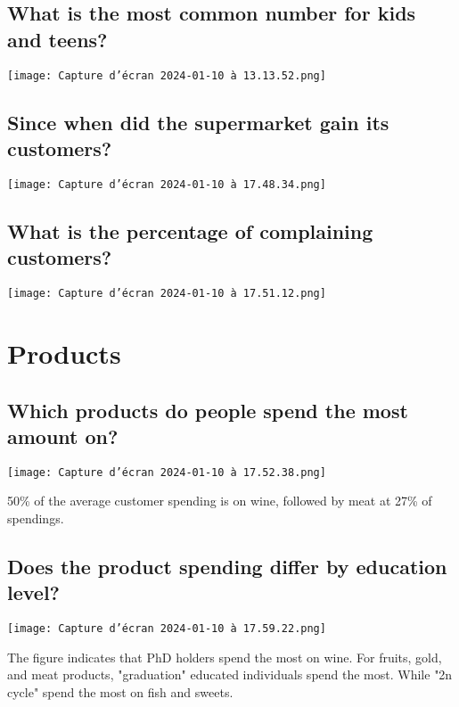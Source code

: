 \documentclass[12pt,a4paper]{report}
\begin{document}
\subsection{What is the most common number for kids and teens?}
\begin{center}
    \texttt{[image: Capture d’écran 2024-01-10 à 13.13.52.png]}            
    \label{fig1}
\end{center}
\subsection{Since when did the supermarket gain its customers?}

\begin{center}
    \texttt{[image: Capture d’écran 2024-01-10 à 17.48.34.png]}            
    \label{fig1}
\end{center}

\subsection{What is the percentage of complaining customers?}
\begin{center}
    \texttt{[image: Capture d’écran 2024-01-10 à 17.51.12.png]}            
    \label{fig1}
\end{center}
\newpage
\section{Products}
\subsection {Which products do people spend the most amount on?}
\begin{center}
    \texttt{[image: Capture d’écran 2024-01-10 à 17.52.38.png]}      
\end{center}     
50\% of the average customer spending is on wine, followed by meat at 27\% of spendings.


\subsection {Does the product spending differ by education level?}
\begin{center}
    \texttt{[image: Capture d’écran 2024-01-10 à 17.59.22.png]}      
\end{center}     
The figure indicates that PhD holders spend the most on wine. For fruits, gold, and meat products, "graduation" educated individuals spend the most. While "2n cycle" spend the most on fish and sweets.
\end{document}

